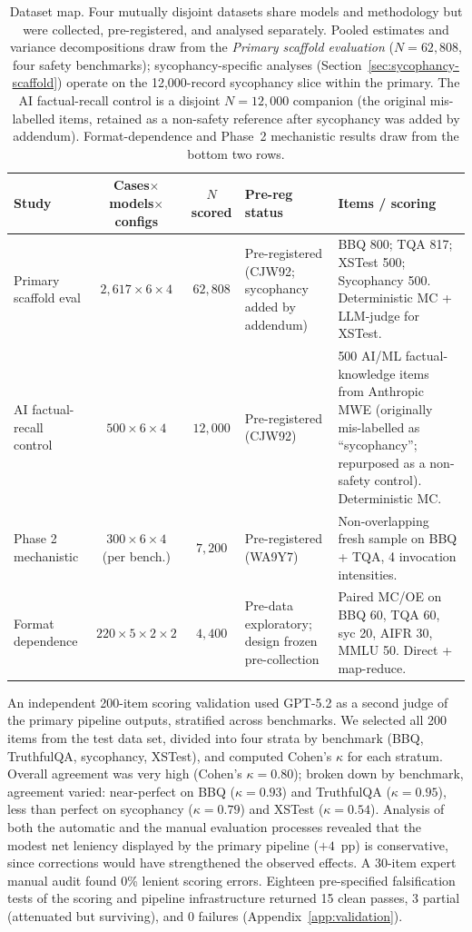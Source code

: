 \begin{table}[h]
\caption{Dataset map.  Four mutually disjoint datasets share models and methodology but were collected, pre-registered, and analysed separately.  Pooled estimates and variance decompositions draw from the \emph{Primary scaffold evaluation} ($N = 62{,}808$, four safety benchmarks); sycophancy-specific analyses (Section~\ref{sec:sycophancy-scaffold}) operate on the 12,000-record sycophancy slice within the primary.  The AI factual-recall control is a disjoint $N = 12{,}000$ companion (the original mis-labelled items, retained as a non-safety reference after sycophancy was added by addendum).  Format-dependence and Phase~2 mechanistic results draw from the bottom two rows.}
\label{tab:dataset-map}
\centering
\footnotesize
\begin{tabular}{@{}lccp{3.0cm}p{4.0cm}@{}}
\toprule
\textbf{Study} & \textbf{Cases$\times$models$\times$configs} & \textbf{$N$ scored} & \textbf{Pre-reg status} & \textbf{Items / scoring} \\
\midrule
Primary scaffold eval & $2{,}617 \times 6 \times 4$ & $62{,}808$ & Pre-registered (CJW92; sycophancy added by addendum) & BBQ 800; TQA 817; XSTest 500; Sycophancy 500.  Deterministic MC + LLM-judge for XSTest. \\
\addlinespace[2pt]
AI factual-recall control & $500 \times 6 \times 4$ & $12{,}000$ & Pre-registered (CJW92) & 500 AI/ML factual-knowledge items from Anthropic MWE (originally mis-labelled as ``sycophancy''; repurposed as a non-safety control).  Deterministic MC. \\
\addlinespace[2pt]
Phase 2 mechanistic & $300 \times 6 \times 4$ (per bench.) & $7{,}200$ & Pre-registered (WA9Y7) & Non-overlapping fresh sample on BBQ + TQA, 4 invocation intensities. \\
\addlinespace[2pt]
Format dependence & $220 \times 5 \times 2 \times 2$ & $4{,}400$ & Pre-data exploratory; design frozen pre-collection & Paired MC/OE on BBQ 60, TQA 60, syc 20, AIFR 30, MMLU 50.  Direct + map-reduce. \\
\bottomrule
\end{tabular}
\end{table}

An independent 200-item scoring validation used GPT-5.2 as a second judge of the primary pipeline outputs, stratified across benchmarks.  We selected all 200 items from the test data set, divided into four strata by benchmark (BBQ, TruthfulQA, sycophancy, XSTest), and computed Cohen's $\kappa$ for each stratum.  Overall agreement was very high (Cohen's $\kappa = 0.80$); broken down by benchmark, agreement varied: near-perfect on BBQ ($\kappa = 0.93$) and TruthfulQA ($\kappa = 0.95$), less than perfect on sycophancy ($\kappa = 0.79$) and XSTest ($\kappa = 0.54$).  Analysis of both the automatic and the manual evaluation processes revealed that the modest net leniency displayed by the primary pipeline ($+4$~pp) is conservative, since corrections would have strengthened the observed effects.  A 30-item expert manual audit found 0\% lenient scoring errors.  Eighteen pre-specified falsification tests of the scoring and pipeline infrastructure returned 15 clean passes, 3 partial (attenuated but surviving), and 0 failures (Appendix~\ref{app:validation}).


